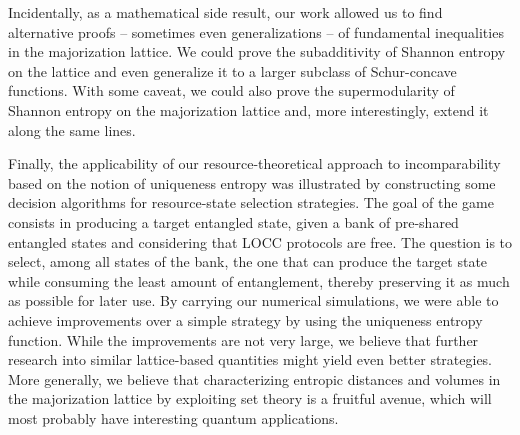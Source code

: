 Incidentally, as a mathematical side result, our work allowed us to find alternative proofs –  sometimes even generalizations – of fundamental inequalities in the majorization lattice. We could prove the subadditivity of Shannon entropy on the lattice and even generalize it to a larger subclass of Schur-concave functions. With some caveat, we could also prove the supermodularity of Shannon entropy on the majorization lattice and, more interestingly, extend it along the same lines. 

Finally, the applicability of our resource-theoretical approach to incomparability based on the notion of uniqueness entropy was illustrated by constructing some decision algorithms for resource-state selection strategies. The goal of the game consists in producing a target entangled state, given a bank of pre-shared entangled states and considering that LOCC protocols are free. The question is to select, among all states of the bank, the one that can produce the target state while consuming the least amount of entanglement, thereby preserving it as much as possible for later use.  By carrying our numerical simulations, we were able to achieve improvements over a simple strategy by using the uniqueness entropy function. While the improvements are not very large, we believe that further research into similar lattice-based quantities might yield even better strategies. More generally, we believe that characterizing entropic distances and volumes in the majorization lattice by exploiting set theory is a fruitful avenue, which will most probably have interesting quantum applications.



